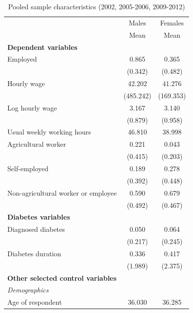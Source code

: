 \documentclass[12pt,english,british]{article}
\newcommand{\sym}[1]{\rlap{#1}}%
\begin{document}
\begin{table}[h]
\caption{\label{tab:Pooled-sample-characteristics}Pooled sample characteristics (2002, 2005-2006, 2009-2012)}
\begin{center}
\begin{adjustbox}{max width=\textwidth}
{
\def\sym#1{\ifmmode^{#1}\else\(^{#1}\)\fi}
\begin{tabular}{l*{2}{c}}
\toprule
                    &\multicolumn{1}{c}{Males}&\multicolumn{1}{c}{Females}\\
                    &        Mean&        Mean\\
\midrule
\textbf{Dependent variables} && \\
Employed            &       0.865&       0.365\\
                    &     (0.342)&     (0.482)\\
Hourly wage            &      42.202&      41.276\\
                    &   (485.242)&   (169.353)\\
Log hourly wage     &       3.167&       3.140\\
                    &     (0.879)&     (0.958)\\
Usual weekly working hours&      46.810&      38.998\\
Agricultural worker &       0.221&       0.043\\
                    &     (0.415)&     (0.203)\\
Self-employed       &       0.189&       0.278\\
                    &     (0.392)&     (0.448)\\
Non-agricultural worker or employee&       0.590&       0.679\\
					&     (0.492)&     (0.467)\\
\textbf{Diabetes variables} && \\
Diagnosed diabetes  &       0.050&       0.064\\
                    &     (0.217)&     (0.245)\\
Diabetes duration   &       0.336&       0.417\\
                    &     (1.989)&     (2.375)\\
\textbf{Other selected control variables} && \\
\hspace*{10mm}\emph{Demographics}&& \\
Age of respondent  &      36.030&      36.285\\

\end{tabular}}
\end{adjustbox}
\end{center}
\end{table}
\end{document}
